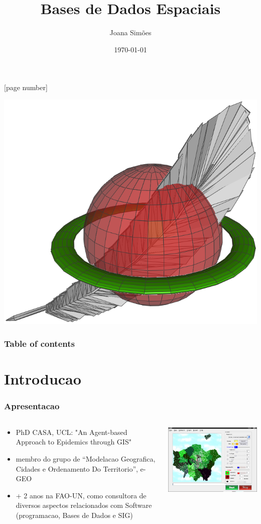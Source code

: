 \documentclass[hyperref={pdfpagelabels=true}]{beamer}
\title{Bases de Dados Espaciais}
\author{Joana Sim\~{o}es}
\date{\today}
\begin{document}
[page number]
\begin{frame}
\begin{titlepage}
\includegraphics[width=.25\textwidth]{spatialite.png}

\end{titlepage}
\end{frame} 

\begin{frame}
\frametitle{Table of contents}
\tableofcontents
\end{frame}
 

\section{Introducao} 
\begin{frame}
\frametitle{Apresentacao}
\begin{columns}
  \begin{column}{7cm}
    \begin{itemize}
      \item<1-> PhD CASA, UCL: "An Agent-based Approach to Epidemics through GIS"
      \item<2-> membro do grupo de ``Modelacao Geografica, Cidades e Ordenamento Do Territorio'', e-GEO
      \item<3-> + 2 anos na FAO-UN, como consultora de diversos aspectos relacionados com Software (programacao, Bases de Dados e SIG)
      \end{itemize}
  \end{column}
  \begin{column}{10cm}
    \includegraphics[scale=0.4]{input1.png}
  \end{column}  
\end{columns}
\end{frame}
\end{document}
